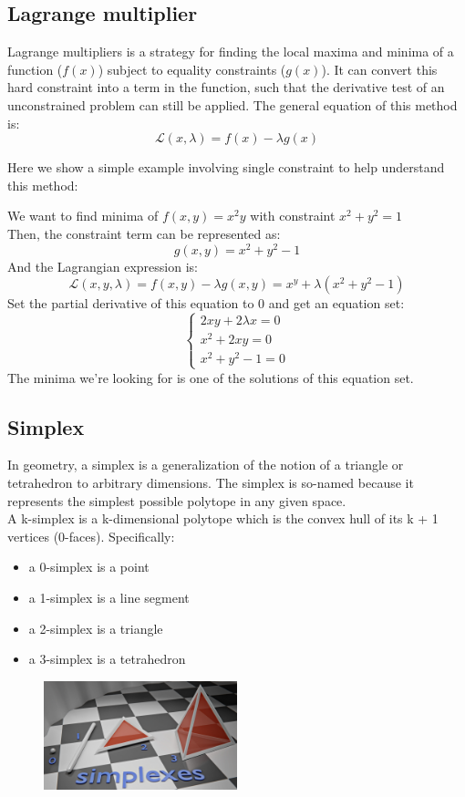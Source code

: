 \documentclass[11pt]{article}
\begin{document}
\subsection{Lagrange multiplier}
Lagrange multipliers is a strategy for finding the local maxima and minima of a function ($f(x)$) subject to equality constraints ($g(x)$). \cite{wiki:lagrange} It can convert this hard constraint into a term in the function, such that the derivative test of an unconstrained problem can still be applied. The general equation of this method is:
\[ \mathcal{L}(x,\lambda) = f(x) - \lambda g(x) \]

Here we show a simple example involving single constraint to help understand this method:

We want to find minima of $f(x,y) = x^2y$ with constraint $ x^2+y^2 = 1 $\\
Then, the constraint term can be represented as:
\[ g(x,y) = x^2+y^2-1 \]
And the Lagrangian expression is:
\[ \mathcal{L}(x,y,\lambda) = f(x,y) - \lambda g(x,y) = x^y + \lambda (x^2+y^2-1) \]
Set the partial derivative of this equation to 0 and get an equation set:
\begin{equation}
\begin{cases}
  2xy + 2\lambda x = 0 \\
  x^2 + 2xy = 0 \\
  x^2+y^2-1 = 0  \nonumber
\end{cases}       
\end{equation}
The minima we're looking for is one of the solutions of this equation set.

\subsection{Simplex}
In geometry, a simplex is a generalization of the notion of a triangle or tetrahedron to arbitrary dimensions. The simplex is so-named because it represents the simplest possible polytope in any given space. \cite{wiki:simplex} \\
A k-simplex is a k-dimensional polytope which is the convex hull of its k + 1 vertices (0-faces). Specifically:
\begin{itemize}
    \item a 0-simplex is a point
    \item a 1-simplex is a line segment
    \item a 2-simplex is a triangle
    \item a 3-simplex is a tetrahedron
\end{itemize}
\begin{figure}[H]
    \centering
    \includegraphics[width=0.5\textwidth]{pic/Simplexes visual.jpg} \cite{wiki:simplex}
\end{figure}
\end{document}
